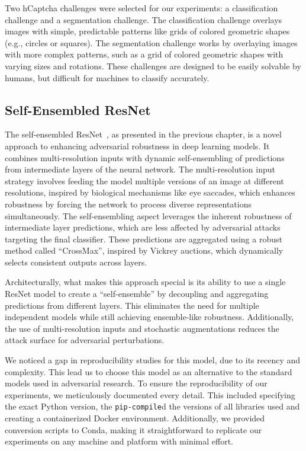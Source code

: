 \documentclass[a4paper, oneside]{discothesis}
\begin{document}
Two hCaptcha challenges were selected for our experiments: a classification challenge and a segmentation challenge. The classification challenge overlays images with simple, predictable patterns like grids of colored geometric shapes (e.g., circles or squares). The segmentation challenge works by overlaying images with more complex patterns, such as a grid of colored geometric shapes with varying sizes and rotations. These challenges are designed to be easily solvable by humans, but difficult for machines to classify accurately.

\subsection{Self-Ensembled ResNet}

The self-ensembled ResNet~\cite{fort2024ensemble}, as presented in the previous chapter, is a novel approach to enhancing adversarial robustness in deep learning models. It combines multi-resolution inputs with dynamic self-ensembling of predictions from intermediate layers of the neural network. The multi-resolution input strategy involves feeding the model multiple versions of an image at different resolutions, inspired by biological mechanisms like eye saccades, which enhances robustness by forcing the network to process diverse representations simultaneously. The self-ensembling aspect leverages the inherent robustness of intermediate layer predictions, which are less affected by adversarial attacks targeting the final classifier. These predictions are aggregated using a robust method called ``CrossMax'', inspired by Vickrey auctions, which dynamically selects consistent outputs across layers.

Architecturally, what makes this approach special is its ability to use a single ResNet model to create a ``self-ensemble'' by decoupling and aggregating predictions from different layers. This eliminates the need for multiple independent models while still achieving ensemble-like robustness. Additionally, the use of multi-resolution inputs and stochastic augmentations reduces the attack surface for adversarial perturbations.

We noticed a gap in reproducibility studies for this model, due to its recency and complexity. This lead us to choose this model as an alternative to the standard models used in adversarial research. To ensure the reproducibility of our experiments, we meticulously documented every detail. This included specifying the exact Python version, the \texttt{pip-compile}d the versions of all libraries used and creating a containerized Docker environment. Additionally, we provided conversion scripts to Conda, making it straightforward to replicate our experiments on any machine and platform with minimal effort.
\end{document}
